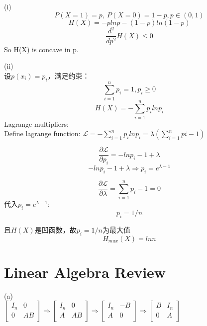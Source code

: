 \documentclass{article}
\begin{document}
\subsection{}
(i)\\
$$P(X=1)=p,\ P(X=0)=1-p, p\in(0,1)$$
$$H(X)=-plnp-(1-p)ln(1-p)$$
$$\frac{d^2}{dp^2}H(X)\le0$$
So H(X) is concave in p.

(ii)\\
设$p(x_i)=p_i$，满足约束：
$$\sum_{i=1}^{n}{p_i}=1, p_i\ge0$$
$$H(X)=-\sum_{i=1}^{n}{p_ilnp_i}$$
Lagrange multipliers:\\
Define lagrange function:
$\mathcal{L}=-\sum_{i=1}^{n}{p_ilnp_i}=\lambda\left(\sum_{i=1}^n{pi}-1\right)$

$$\frac{\partial\mathcal{L}}{\partial{p_i}}=-lnp_i-1+\lambda$$
$$-lnp_i-1+\lambda\Rightarrow{p_i=e^{\lambda-1}}$$

$$\frac{\partial\mathcal{L}}{\partial\lambda}=\sum_{i=1}^{n}{p_i}-1=0$$
代入$p_i=e^{\lambda-1}$:
$$p_i=1/n$$

且$H(X)$是凹函数，故$p_i=1/n$为最大值
$$H_{max}(X)=lnn$$

\section{Linear Algebra Review}
(a)\\

$
\left[
\begin{matrix}
I_n & 0 \\
0 & AB\\
\end{matrix}
\right]
\Rightarrow{ }
\left[
\begin{matrix}
I_n & 0 \\
A & AB\\
\end{matrix}
\right]
\Rightarrow{ }
\left[
\begin{matrix}
I_n & -B \\
A & 0\\
\end{matrix}
\right]
\Rightarrow{ }
\left[
\begin{matrix}
B & I_n \\
0 & A\\
\end{matrix}
\right]
$
\end{document}
